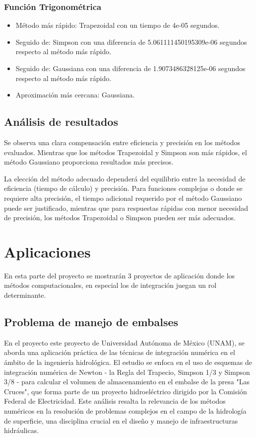 \documentclass[a4paper]{article}
\begin{document}
    \subsubsection{Función Trigonométrica}
    \begin{itemize}
        \item Método más rápido: Trapezoidal con un tiempo de 4e-05 segundos.
        \item Seguido de: Simpson con una diferencia de 5.061111450195309e-06 segundos respecto al método más rápido.
        \item Seguido de: Gaussiana con una diferencia de 1.9073486328125e-06 segundos respecto al método más rápido.
        \item Aproximación más cercana: Gaussiana. 
    \end{itemize}
    
    \subsection{Análisis de resultados}
    Se observa una clara compensación entre eficiencia y precisión en los métodos evaluados. Mientras que los métodos Trapezoidal y Simpson son más rápidos, el método Gaussiano proporciona resultados más precisos. 
    
    La elección del método adecuado dependerá del equilibrio entre la necesidad de eficiencia (tiempo de cálculo) y precisión. Para funciones complejas o donde se requiere alta precisión, el tiempo adicional requerido por el método Gaussiano puede ser justificado, mientras que para respuestas rápidas con menor necesidad de precisión, los métodos Trapezoidal o Simpson pueden ser más adecuados.
    
    \section{Aplicaciones}
    En esta parte del proyecto se mostrarán 3 proyectos de aplicación donde los métodos computacionales, en especial los de integración juegan un rol determinante.

    \subsection{Problema de manejo de embalses}
    En el proyecto este proyecto de Universidad Autónoma de México (UNAM), se aborda una aplicación práctica de las técnicas de integración numérica en el ámbito de la ingeniería hidrológica. El estudio se enfoca en el uso de esquemas de integración numérica de Newton - la Regla del Trapecio, Simpson 1/3 y Simpson 3/8 - para calcular el volumen de almacenamiento en el embalse de la presa "Las Cruces", que forma parte de un proyecto hidroeléctrico dirigido por la Comisión Federal de Electricidad. Este análisis resalta la relevancia de los métodos numéricos en la resolución de problemas complejos en el campo de la hidrología de superficie, una disciplina crucial en el diseño y manejo de infraestructuras hidráulicas.
\end{document}
